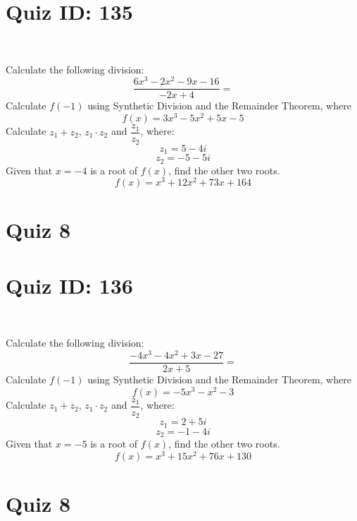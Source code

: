 \documentclass{exam}
\begin{document}
\section*{Quiz ID: 135}
\vspace{0.5cm}\
\vspace{1cm}\
\begin{questions}
\question Calculate the following division:\[\dfrac{
6x^3 - 2x^2 - 9x - 16}{
-2x + 4}=\] \makeemptybox{\stretch{2}}
\question Calculate $f(-1)$ using Synthetic Division and the Remainder Theorem, where\[f(x) = 
3x^3 - 5x^2 + 5x - 5\]
\newpage\question Calculate $z_1+z_2$, $z_1\cdot z_2$ and $\dfrac{z_1}{z_2}$, where:\[z_1=5-4\mathit{i}\]\[z_2=-5-5\mathit{i}\]
\question Given that $x=-4$ is a root of $f(x)$, find the other two roots.\[f(x)=
x^3 + 12x^2 + 73x + 164\]\makeemptybox{\stretch{1}}
\end{questions}\newpage
\newpage
\section*{Quiz 8}
\section*{Quiz ID: 136}
\vspace{0.5cm}\
\vspace{1cm}\
\begin{questions}
\question Calculate the following division:\[\dfrac{
-4x^3 - 4x^2 + 3x - 27}{
2x + 5}=\] 
\question Calculate $f(-1)$ using Synthetic Division and the Remainder Theorem, where\[f(x) = 
-5x^3 - x^2 - 3\]
\newpage\question Calculate $z_1+z_2$, $z_1\cdot z_2$ and $\dfrac{z_1}{z_2}$, where:\[z_1=2+5\mathit{i}\]\[z_2=-1-4\mathit{i}\]\makeemptybox{\stretch{1}}
\question Given that $x=-5$ is a root of $f(x)$, find the other two roots.\[f(x)=
x^3 + 15x^2 + 76x + 130\]\makeemptybox{\stretch{1}}
\end{questions}\newpage
\newpage
\section*{Quiz 8}
\end{document}
